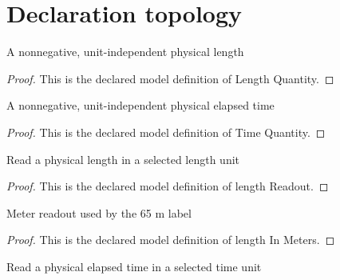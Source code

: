 \section{Declaration topology}
\begin{definition}
  \label{def:physics:phyx-mini-0552:phyxminiproblems-problemphyxmini0552-lengthquantity}
  A nonnegative, unit-independent physical length
\end{definition}
\begin{proof}
  This is the declared model definition of Length Quantity.
\end{proof}
\begin{definition}
  \label{def:physics:phyx-mini-0552:phyxminiproblems-problemphyxmini0552-timequantity}
  A nonnegative, unit-independent physical elapsed time
\end{definition}
\begin{proof}
  This is the declared model definition of Time Quantity.
\end{proof}
\begin{definition}
  \label{def:physics:phyx-mini-0552:phyxminiproblems-problemphyxmini0552-lengthreadout}
  Read a physical length in a selected length unit
\end{definition}
\begin{proof}
  This is the declared model definition of length Readout.
\end{proof}
\begin{definition}
  \label{def:physics:phyx-mini-0552:phyxminiproblems-problemphyxmini0552-lengthinmeters}
  Meter readout used by the 65 m label
\end{definition}
\begin{proof}
  This is the declared model definition of length In Meters.
\end{proof}
\begin{definition}
  \label{def:physics:phyx-mini-0552:phyxminiproblems-problemphyxmini0552-timereadout}
  Read a physical elapsed time in a selected time unit
\end{definition}
